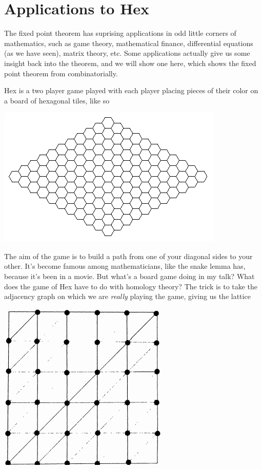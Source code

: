 \documentclass{article}
\theoremstyle{plain}
\begin{document}
\section{Applications to Hex}

The fixed point theorem has suprising applications in odd little corners of mathematics, such as game theory, mathematical finance, differential equations (as we have seen), matrix theory, etc. Some applications actually give us some insight back into the theorem, and we will show one here, which shows the fixed point theorem from combinatorially.

Hex is a two player game played with each player placing pieces of their color on a board of hexagonal tiles, like so
%
\begin{center}
\includegraphics[scale=0.4]{hex.png}
\end{center}
%
The aim of the game is to build a path from one of your diagonal sides to your other. It's become famous among mathematicians, like the snake lemma has, because it's been in a movie. But what's a board game doing in my talk? What does the game of Hex have to do with homology theory? The trick is to take the adjacency graph on which we are {\it really} playing the game, giving us the lattice

\begin{center}
\includegraphics[scale=0.4]{lattice.png}
\end{center}
\end{document}
